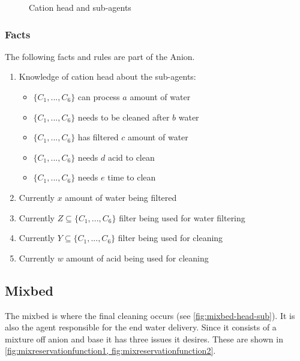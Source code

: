 \begin{figure}[h]
	\centering
	\caption{Cation head and sub-agents}
	\label{fig:cation-head-sub}
\end{figure}
\subsubsection{Facts}
The following facts and rules are part of the Anion.

\begin{enumerate}
	\item
	Knowledge of cation head about the sub-agents:
	\begin{itemize}
		\item {$\{C_1, ..., C_6\}$ can process $a$ amount of water}
		\item {$\{C_1, ..., C_6\}$ needs to be cleaned after $b$ water}
		\item {$\{C_1, ..., C_6\}$ has filtered $c$ amount of water}
		\item {$\{C_1, ..., C_6\}$ needs $d$ acid to clean}
		\item {$\{C_1, ..., C_6\}$ needs $e$ time to clean}
	\end{itemize}
	\item
	Currently $x$ amount of water being filtered 
	\item
	Currently $Z \subseteq \{C_1, ..., C_6\}$ filter being used for water filtering
	\item
	Currently $Y \subseteq \{C_1, ..., C_6\}$ filter being used for cleaning
	\item
	Currently $w$ amount of acid being used for cleaning
\end{enumerate}

\clearpage
\subsection{Mixbed}
The mixbed is where the final cleaning occurs (see \cref{fig:mixbed-head-sub}). It is also the agent responsible for the end water delivery. Since it consists of a mixture off anion and base it has three issues it desires. These are shown in \cref{fig:mixreservationfunction1, fig:mixreservationfunction2}.


